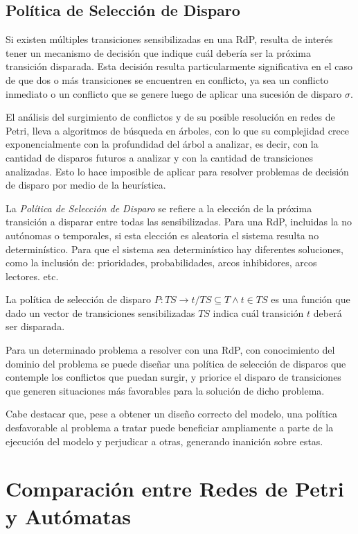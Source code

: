 \subsection{Política de Selección de Disparo}

Si existen múltiples transiciones sensibilizadas en una RdP, resulta de interés
tener un mecanismo de decisión que indique cuál debería ser la próxima
transición disparada.
Esta decisión resulta particularmente significativa en el caso de que dos o más
transiciones se encuentren en conflicto, ya sea un conflicto inmediato o un
conflicto que se genere luego de aplicar una sucesión de disparo $\sigma$.

El análisis del surgimiento de conflictos y de su posible resolución en redes de
Petri, lleva a algoritmos de búsqueda en árboles, con lo que su complejidad
crece exponencialmente con la profundidad del árbol a analizar, es decir, con
la cantidad de disparos futuros a analizar y con la cantidad de transiciones
analizadas. Esto lo hace imposible de aplicar para resolver problemas de
decisión de disparo por medio de la heurística.

La \textit{Política de Selección de Disparo} se refiere a la elección de la
próxima transición a disparar entre todas las sensibilizadas. Para una RdP,
incluidas la no autónomas o temporales, si esta elección es aleatoria el sistema
resulta no determinístico. Para que el sistema sea determinístico hay diferentes
soluciones, como la inclusión de: prioridades, probabilidades, arcos
inhibidores, arcos lectores. etc. \cite{Ecuacion_generalizada_LAC}

La política de selección de disparo $P : TS \rightarrow t \slash TS \subseteq T
\land t \in TS $ es una función que dado un vector de transiciones
sensibilizadas $TS$ indica cuál transición $t$ deberá ser disparada.

Para un determinado problema a resolver con una RdP, con conocimiento del
dominio del problema se puede diseñar una política de selección de disparos que
contemple los conflictos que puedan surgir, y priorice el disparo de
transiciones que generen situaciones más favorables para la solución de dicho
problema.

Cabe destacar que, pese a obtener un diseño correcto del modelo, una política
desfavorable al problema a tratar puede beneficiar ampliamente a parte de la
ejecución del modelo y perjudicar a otras, generando inanición sobre estas.


\section{Comparación entre Redes de Petri y Autómatas}
\label{comparacion_rdp_automatas}

